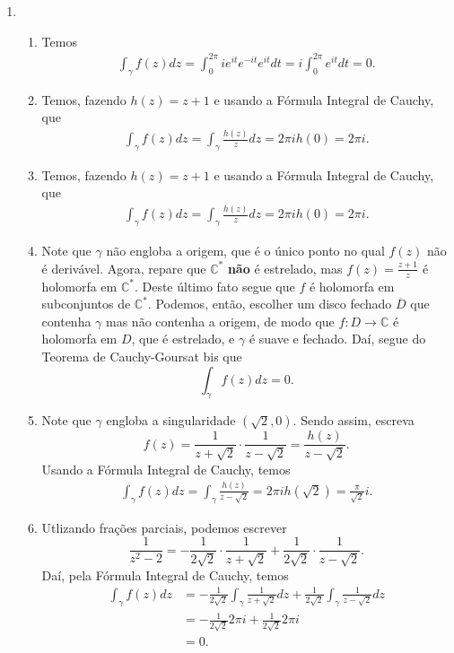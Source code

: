 \documentclass[12pt,a4paper]{article}
\begin{document}
\begin{enumerate}
		\item\begin{enumerate}
			\item Temos
			\begin{align*}
			\int_{\gamma}f(z)dz = \int_{0}^{2\pi}ie^{it}e^{-it}e^{it}dt = i\int_{0}^{2\pi}e^{it}dt = 0.
			\end{align*}
			
			\item Temos, fazendo $h(z) = z+1$ e usando a Fórmula Integral de Cauchy, que
			\begin{align*}
			\int_{\gamma}f(z)dz = \int_{\gamma}\frac{h(z)}{z}dz = 2\pi ih(0) = 2\pi i.
			\end{align*}
			
			\item Temos, fazendo $h(z) = z+1$ e usando a Fórmula Integral de Cauchy, que
			\begin{align*}
			\int_{\gamma}f(z)dz = \int_{\gamma}\frac{h(z)}{z}dz = 2\pi i h(0) = 2\pi i.
			\end{align*}
			
			\item Note que $\gamma$ não engloba a origem, que é o único ponto no qual $f(z)$ não é derivável. Agora, repare que $\mathbb{C}^*$ \textbf{não} é estrelado, mas $f(z) = \displaystyle{\frac{z+1}{z}}$ é holomorfa em $\mathbb{C}^*$. Deste último fato segue que $f$ é holomorfa em subconjuntos de $\mathbb{C}^*$. Podemos, então, escolher um disco fechado $\overline{D}$ que contenha $\gamma$ mas não contenha a origem, de modo que $f:D\to \mathbb{C}$ é holomorfa em $D$, que é estrelado, e $\gamma$ é suave e fechado. Daí, segue do Teorema de Cauchy-Goursat bis que 
			$$
			\int_{\gamma}f(z)dz = 0.
			$$
			
			\item Note que $\gamma$ engloba a singularidade $(\sqrt{2},0)$. Sendo assim, escreva
			$$
			f(z) = \frac{1}{z+\sqrt{2}}\cdot\frac{1}{z-\sqrt{2}} = \frac{h(z)}{z-\sqrt{2}}.
			$$
			Usando a Fórmula Integral de Cauchy, temos
			\begin{align*}
			\int_{\gamma}f(z)dz = \int_{\gamma} \frac{h(z)}{z-\sqrt{2}} = 2\pi ih(\sqrt{2}) = \frac{\pi}{\sqrt{2}}i.
			\end{align*}
			
			\item Utlizando frações parciais, podemos escrever
			$$
			\frac{1}{z^2 - 2} = -\frac{1}{2\sqrt{2}}\cdot\frac{1}{z+\sqrt{2}} + \frac{1}{2\sqrt{2}}\cdot\frac{1}{z-\sqrt{2}}.
			$$		
			Daí, pela Fórmula Integral de Cauchy, temos
			\begin{align*}
			\int_{\gamma}f(z)dz &= -\frac{1}{2\sqrt{2}}\int_{\gamma}\frac{1}{z+\sqrt{2}}dz +\frac{1}{2\sqrt{2}}\int_{\gamma}\frac{1}{z-\sqrt{2}}dz \\
			&= -\frac{1}{2\sqrt{2}}2\pi i +\frac{1}{2\sqrt{2}}2\pi i \\
			&= 0.
			\end{align*}
			

\end{enumerate}
\end{enumerate}
\end{document}
